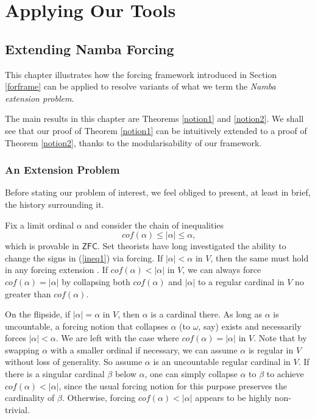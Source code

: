 \documentclass[12pt, twoside]{memoir}
\numberwithin{equation}{section}
\theoremstyle{definition}
\theoremstyle{remark}
\theoremstyle{definition}
\theoremstyle{definition}
\theoremstyle{definition}
\theoremstyle{remark}
\newcommand{\blankpage}{
\newpage
\thispagestyle{empty}
\mbox{}
\newpage
}
\begin{document}
\blankpage

\part{Applying Our Tools}

\chapter{Extending Namba Forcing}\label{sect2}

This chapter illustrates how the forcing framework introduced in Section \ref{forframe} can be applied to resolve variants of what we term the \textit{Namba extension problem}.

The main results in this chapter are Theorems \ref{notion1} and \ref{notion2}. We shall see that our proof of Theorem \ref{notion1} can be intuitively extended to a proof of Theorem \ref{notion2}, thanks to the modularisability of our framework.

\section{An Extension Problem}

Before stating our problem of interest, we feel obliged to present, at least in brief, the history surrounding it. 

Fix a limit ordinal $\alpha$ and consider the chain of inequalities
\begin{equation}\label{ineq1}
    cof(\alpha) \leq |\alpha| \leq \alpha \text{,}
\end{equation} 
which is provable in $\mathsf{ZFC}$. Set theorists have long investigated the ability to change the signs in (\ref{ineq1}) via forcing. If $|\alpha| < \alpha$ in $V$, then the same must hold in any forcing extension . If $cof(\alpha) < |\alpha|$ in $V$, we can always force $cof(\alpha) = |\alpha|$ by collapsing both $cof(\alpha)$ and $|\alpha|$ to a regular cardinal in $V$ no greater than $cof(\alpha)$.

On the flipside, if $|\alpha| = \alpha$ in $V$, then $\alpha$ is a cardinal there. As long as $\alpha$ is uncountable, a forcing notion that collapses $\alpha$ (to $\omega$, say) exists and necessarily forces $|\alpha| < \alpha$. We are left with the case where $cof(\alpha) = |\alpha|$ in $V$. Note that by swapping $\alpha$ with a smaller ordinal if necessary, we can assume $\alpha$ is regular in $V$ without loss of generality. So assume $\alpha$ is an uncountable regular cardinal in $V$. If there is a singular cardinal $\beta$ below $\alpha$, one can simply collapse $\alpha$ to $\beta$ to achieve $cof(\alpha) < |\alpha|$, since the usual forcing notion for this purpose preserves the cardinality of $\beta$. Otherwise, forcing $cof(\alpha) < |\alpha|$ appears to be highly non-trivial.
\end{document}
